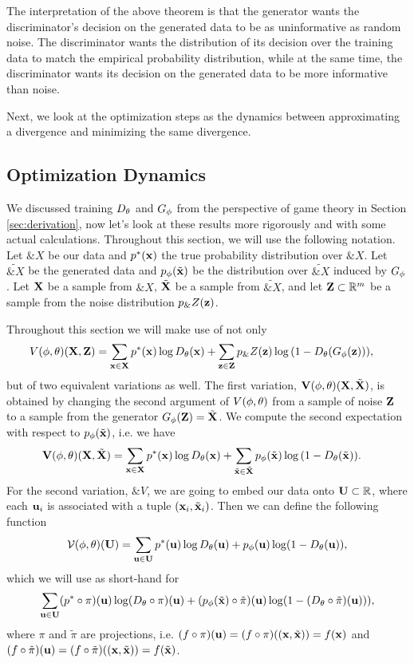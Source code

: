 The interpretation of the above theorem is that the generator wants
the discriminator's decision on the generated data to be as
uninformative as random noise.  The discriminator wants the
distribution of its decision over the training data to match the
empirical probability distribution, while at the same time, the
discriminator wants its decision on the generated data to be more
informative than noise.

Next, we look at the optimization steps as the dynamics between
approximating a divergence and minimizing the same divergence.

\subsection{Optimization Dynamics}
\label{sec:optimization-dynamics}

We discussed training $D_\theta$ and $G_\phi$ from the perspective of game
theory in Section \ref{sec:derivation}, now let's look at these
results more rigorously and with some actual calculations. Throughout
this section, we will use the following notation. Let $\&X$ be our
data and $p^*(\mathbf{x})$ the true probability distribution over $\&X$. Let
$\tilde{\&X}$ be the generated data and $p_{\phi}(\tilde{\mathbf{x}})$ be the distribution over
$\tilde{\&X}$ induced by $G_\phi$. Let $\mathbf{X}$ be a sample from $\&X$,
$\tilde{\mathbf{X}}$ be a sample from $\tilde{\&X}$, and let
$\mathbf{Z} \subset \mathbb{R}^m$ be a sample from the noise distribution $p_\&Z(\mathbf{z})$.

Throughout this section we will make use of not only
\begin{align} V(\phi, \theta)(\mathbf{X}, \mathbf{Z}) & = \sum_{\mathbf{x} \in \mathbf{X}}p^*(\mathbf{x})\log{D_\theta(\mathbf{x})} +
  \sum_{\mathbf{z} \in \mathbf{Z}}p_\&Z(\mathbf{z})\log{(1 - D_\theta(G_\phi(\mathbf{z})))},
\end{align}
but of two equivalent variations as well. The first variation, $\mathbf{V}(\phi,
\theta)(\mathbf{X}, \tilde{\mathbf{X}})$, is obtained by changing the second argument of $V(\phi, \theta)$
from a sample of noise $\mathbf{Z}$ to a sample from the generator $G_\phi(\mathbf{Z}) =
\tilde{\mathbf{X}}$. We compute the second expectation with respect to $p_{\phi}(\tilde{\mathbf{x}})$, i.e. we
have
\begin{align} \mathbf{V}(\phi, \theta)(\mathbf{X}, \tilde{\mathbf{X}}) & = \sum_{\mathbf{x} \in
    \mathbf{X}}p^*(\mathbf{x})\log{D_\theta(\mathbf{x})} + \sum_{\tilde{\mathbf{x}} \in \tilde{\mathbf{X}}}p_{\phi}(\tilde{\mathbf{x}})\log{(1 -
    D_\theta(\tilde{\mathbf{x}}))}.
\end{align}
For the second variation, $\&V$, we are going to embed our data onto $\mathbf{U}
\subset \mathbb{R}$, where each $\mathbf{u}_i$ is associated with a tuple $(\mathbf{x}_i,
\tilde{\mathbf{x}}_i)$. Then we can define the following function
\begin{align}
  \label{eq:joined}
  \mathcal{V}(\phi, \theta)(\mathbf{U}) = \sum_{\mathbf{u} \in \mathbf{U}} p^*(\mathbf{u}) \log D_\theta(\mathbf{u}) + p_{\phi}(\mathbf{u}) \log(1 - D_\theta(\mathbf{u})),
\end{align}
which we will use as short-hand for
\begin{align}
  \label{eq:joined-verbose}
  \sum_{\mathbf{u} \in \mathbf{U}} (p^* \circ \pi)(\mathbf{u})\log (D_\theta \circ \pi)(\mathbf{u}) + (p_{\phi}(\tilde{\mathbf{x}}) \circ \tilde{\pi})(\mathbf{u}) \log(1 - (D_\theta \circ \tilde{\pi})(\mathbf{u}))),
\end{align}
where $\pi$ and $\tilde{\pi}$ are projections, i.e. $(f \circ \pi)(\mathbf{u}) = (f
\circ \pi)((\mathbf{x}, \tilde{\mathbf{x}})) = f(\mathbf{x})$ and $(f \circ \tilde{\pi})(\mathbf{u}) = (f
\circ \tilde{\pi})((\mathbf{x}, \tilde{\mathbf{x}})) = f(\tilde{\mathbf{x}})$.

